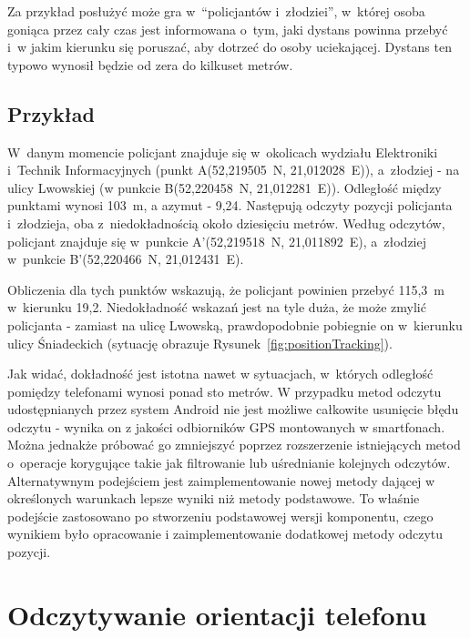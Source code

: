 \documentclass[a4paper,twocolumn,11pt]{article}
\begin{document}
 Za przykład posłużyć może gra w~``policjantów i~złodziei'', w~której osoba goniąca przez cały czas jest informowana o~tym, jaki dystans powinna przebyć i~w jakim kierunku się poruszać, aby dotrzeć do osoby uciekającej.
 Dystans ten typowo wynosił będzie od zera do kilkuset metrów.
 
 \subsection{Przykład}
 W~danym momencie policjant znajduje się w~okolicach wydziału Elektroniki i~Technik Informacyjnych (punkt A(52,219505\textdegree~N, 21,012028\textdegree~E)), a~złodziej - na ulicy Lwowskiej (w punkcie B(52,220458\textdegree~N, 21,012281\textdegree~E)).
 Odległość między punktami wynosi 103~m, a azymut - 9,24\textdegree.
 Następują odczyty pozycji policjanta i~złodzieja, oba z~niedokładnością około dziesięciu metrów.
 Według odczytów, policjant znajduje się w~punkcie A'(52,219518\textdegree~N, 21,011892\textdegree~E), a~złodziej w~punkcie B'(52,220466\textdegree~N, 21,012431\textdegree~E).
 
 Obliczenia dla tych punktów wskazują, że policjant powinien przebyć 115,3~m w~kierunku 19,2\textdegree.
 Niedokładność wskazań jest na tyle duża, że może zmylić policjanta - zamiast na ulicę Lwowską, prawdopodobnie pobiegnie on w~kierunku ulicy Śniadeckich (sytuację obrazuje Rysunek~\ref{fig:positionTracking}).


 
 Jak widać, dokładność jest istotna nawet w sytuacjach, w~których odległość pomiędzy telefonami wynosi ponad sto metrów.
 W przypadku metod odczytu udostępnianych przez system Android nie jest możliwe całkowite usunięcie błędu odczytu - wynika on z jakości odbiorników GPS montowanych w smartfonach.
 Można jednakże próbować go zmniejszyć poprzez rozszerzenie istniejących metod o~operacje korygujące takie jak filtrowanie lub uśrednianie kolejnych odczytów.
 Alternatywnym podejściem jest zaimplementowanie nowej metody dającej w określonych warunkach lepsze wyniki niż metody podstawowe.
 To właśnie podejście zastosowano po stworzeniu podstawowej wersji komponentu, czego wynikiem było opracowanie i zaimplementowanie dodatkowej metody odczytu pozycji.




\section{Odczytywanie orientacji telefonu}
\end{document}
